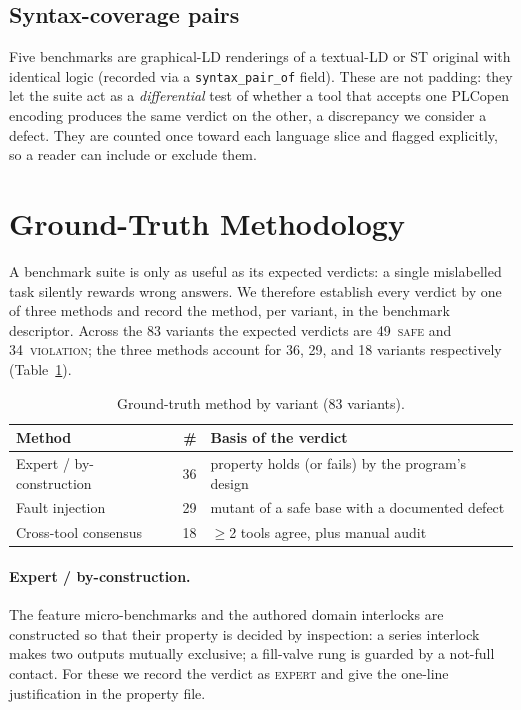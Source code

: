 \subsection{Syntax-coverage pairs}
Five benchmarks are graphical-LD renderings of a textual-LD or ST original with
identical logic (recorded via a \texttt{syntax\_pair\_of} field). These are not
padding: they let the suite act as a \emph{differential} test of whether a tool that
accepts one PLCopen encoding produces the same verdict on the other, a discrepancy we
consider a defect. They are counted once toward each language slice and flagged
explicitly, so a reader can include or exclude them.


\section{Ground-Truth Methodology}
\label{sec:groundtruth}

A benchmark suite is only as useful as its expected verdicts: a single mislabelled
task silently rewards wrong answers. We therefore establish every verdict by one of
three methods and record the method, per variant, in the benchmark descriptor.
Across the 83 variants the expected verdicts are 49~\textsc{safe} and
34~\textsc{violation}; the three methods account for 36, 29, and 18 variants
respectively (Table~\ref{tab:groundtruth}).

\begin{table}[t]
  \centering\small
  \caption{Ground-truth method by variant (83 variants).}
  \label{tab:groundtruth}
  \begin{tabular}{@{}lr l@{}}
    \toprule
    \textbf{Method} & \textbf{\#} & \textbf{Basis of the verdict}\\
    \midrule
    Expert / by-construction     & 36 & property holds (or fails) by the program's design\\
    Fault injection              & 29 & mutant of a safe base with a documented defect\\
    Cross-tool consensus         & 18 & $\geq$2 tools agree, plus manual audit\\
    \bottomrule
  \end{tabular}
\end{table}

\paragraph{Expert / by-construction.}
The feature micro-benchmarks and the authored domain interlocks are constructed so
that their property is decided by inspection: a series interlock makes two outputs
mutually exclusive; a fill-valve rung is guarded by a not-full contact. For these we
record the verdict as \textsc{expert} and give the one-line justification in the
property file.

